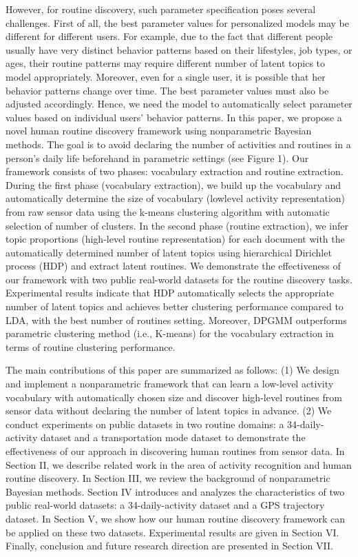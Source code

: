However, for routine discovery, such parameter specification poses several challenges. First of all, the best parameter values for personalized 
models may be different for different users.
For example, due to the fact that different people usually have very distinct behavior patterns based on their lifestyles, job types, or ages, 
their routine patterns may require different number of latent topics to model appropriately. Moreover, even for a single user, it is possible 
that her behavior patterns change over time. The best parameter values must also be adjusted accordingly. Hence, we need the model to automatically 
select parameter values based on individual users' behavior patterns.
In this paper, we propose a novel human routine discovery framework using nonparametric Bayesian methods. The goal is to avoid declaring the number of 
activities and routines in a person's daily life beforehand in parametric settings (see Figure 1). Our framework consists of two phases: vocabulary 
extraction and routine extraction. During the first
phase (vocabulary extraction), we build up the vocabulary and automatically determine the size of vocabulary (lowlevel activity representation) 
from raw sensor data using the k-means clustering algorithm with automatic selection of number of clusters. In the second phase (routine extraction), 
we infer topic proportions (high-level routine representation) for each document with the automatically determined number of latent topics using hierarchical 
Dirichlet process (HDP) and extract latent routines. We demonstrate the effectiveness of our framework with two public real-world datasets for the routine 
discovery tasks. Experimental results indicate that HDP automatically
selects the appropriate number of latent topics and achieves
better clustering performance compared to LDA, with the best
number of routines setting. Moreover, DPGMM outperforms
parametric clustering method (i.e., K-means) for the vocabulary
extraction in terms of routine clustering performance.

The main contributions of this paper are summarized as follows: (1) We design and implement a nonparametric framework that can learn a low-level activity vocabulary with automatically chosen size and discover high-level routines from sensor data without declaring the number of latent topics in advance. (2) We conduct experiments on public datasets
in two routine domains: a 34-daily-activity dataset and a transportation mode dataset to demonstrate the effectiveness of our approach in discovering human routines from sensor data.
In Section II, we describe related work in the area of activity recognition and human routine discovery. In Section III, we review the background of nonparametric Bayesian methods.
Section IV introduces and analyzes the characteristics of two public real-world datasets: a 34-daily-activity dataset and a GPS trajectory dataset. In Section V, we show how our human routine discovery framework can be applied on these two datasets. Experimental results are given in Section VI. Finally, conclusion and future research direction are presented in Section VII.




